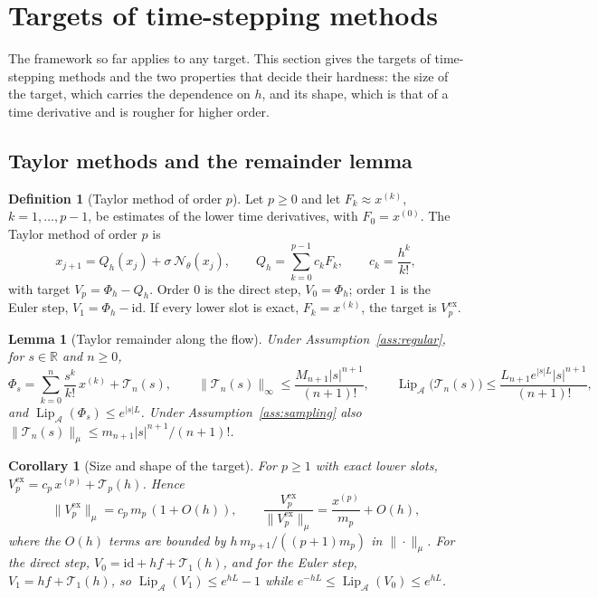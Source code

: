 \documentclass[11pt]{article}
\newtheorem{lemma}{Lemma}
\newtheorem{corollary}{Corollary}
\theoremstyle{definition}
\newtheorem{definition}{Definition}
\theoremstyle{remark}
\newcommand{\R}{\mathbb{R}}
\newcommand{\Aset}{\mathcal{A}}
\newcommand{\Net}{\mathcal{N}_\theta}
\newcommand{\Lip}{\operatorname{Lip}_{\Aset}}
\newcommand{\ex}{\mathrm{ex}}
\newcommand{\id}{\mathrm{id}}
\newcommand{\Rem}{\mathcal{T}}
\begin{document}
\section{Targets of time-stepping methods}\label{sec:targets}

The framework so far applies to any target.
This section gives the targets of time-stepping methods and the two properties that decide their hardness: the size of the target, which carries the dependence on $h$, and its shape, which is that of a time derivative and is rougher for higher order.

\subsection{Taylor methods and the remainder lemma}

\begin{definition}[Taylor method of order $p$]\label{def:taylor}
Let $p \ge 0$ and let $F_k \approx x^{(k)}$, $k = 1,\dots,p-1$, be estimates of the lower time derivatives, with $F_0 = x^{(0)}$.
The Taylor method of order $p$ is
\begin{equation}\label{eq:taylor}
x_{j+1} = Q_h(x_j) + \sigma\,\Net(x_j), \qquad Q_h = \sum_{k=0}^{p-1} c_k F_k, \qquad c_k = \frac{h^k}{k!},
\end{equation}
with target $V_p = \Phi_h - Q_h$.
Order $0$ is the direct step, $V_0 = \Phi_h$; order $1$ is the Euler step, $V_1 = \Phi_h - \id$.
If every lower slot is exact, $F_k = x^{(k)}$, the target is $V_p^\ex$.
\end{definition}

\begin{lemma}[Taylor remainder along the flow]\label{lem:remainder}
Under Assumption~\ref{ass:regular}, for $s \in \R$ and $n \ge 0$,
\begin{equation}\label{eq:remainder}
\Phi_s = \sum_{k=0}^{n}\frac{s^k}{k!}\,x^{(k)} + \Rem_n(s), \qquad
\|\Rem_n(s)\|_\infty \le \frac{M_{n+1}|s|^{n+1}}{(n+1)!}, \qquad
\Lip\big(\Rem_n(s)\big) \le \frac{L_{n+1}e^{|s|L}|s|^{n+1}}{(n+1)!},
\end{equation}
and $\Lip(\Phi_s) \le e^{|s|L}$.
Under Assumption~\ref{ass:sampling} also $\|\Rem_n(s)\|_\mu \le m_{n+1}|s|^{n+1}/(n+1)!$.
\end{lemma}

\begin{corollary}[Size and shape of the target]\label{cor:target}
For $p \ge 1$ with exact lower slots, $V_p^\ex = c_p\,x^{(p)} + \Rem_p(h)$.
Hence
\begin{equation}\label{eq:size-shape}
\|V_p^\ex\|_\mu = c_p\,m_p\,(1 + O(h)), \qquad \frac{V_p^\ex}{\|V_p^\ex\|_\mu} = \frac{x^{(p)}}{m_p} + O(h) ,
\end{equation}
where the $O(h)$ terms are bounded by $h\,m_{p+1}/((p+1)m_p)$ in $\|\cdot\|_\mu$.
For the direct step, $V_0 = \id + hf + \Rem_1(h)$, and for the Euler step, $V_1 = hf + \Rem_1(h)$, so $\Lip(V_1) \le e^{hL}-1$ while $e^{-hL} \le \Lip(V_0) \le e^{hL}$.
\end{corollary}
\end{document}
